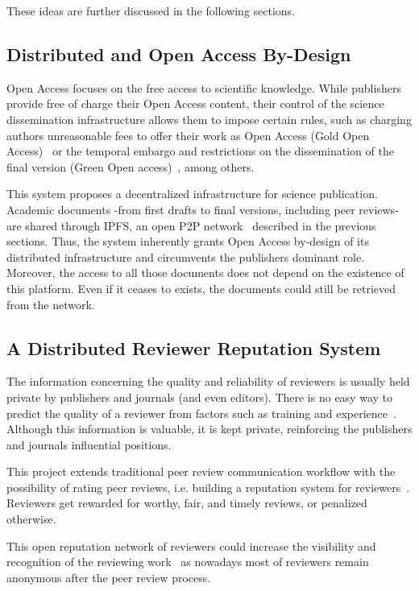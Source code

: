 These ideas are further discussed in the following sections.

\subsection{Distributed and Open Access By-Design}
\label{sec:open-access-design}

Open Access focuses on the free access to scientific knowledge. While publishers
provide free of charge their Open Access content, their control of the science
dissemination infrastructure allows them to impose certain rules, such as
charging authors unreasonable fees to offer their work as Open Access (Gold Open
Access)~\cite{solomon2012study} or the temporal embargo and restrictions on the
dissemination of the final version (Green Open access)~\cite{bjork2014anatomy},
among others.

This system proposes a decentralized infrastructure for science publication.
Academic documents -from first drafts to final versions, including peer reviews-
are shared through IPFS, an open P2P network~\cite{benet_ipfs-content_2014}
described in the previous sections. Thus, the system inherently grants Open
Access by-design of its distributed infrastructure and circumvents the
publishers dominant role. Moreover, the access to all those documents does not
depend on the existence of this platform. Even if it ceases to exists, the
documents could still be retrieved from the network.

\subsection{A Distributed Reviewer Reputation System}
\label{sec:distr-revi-reput}

The information concerning the quality and reliability of reviewers is usually
held private by publishers and journals (and even editors). There is no easy way
to predict the quality of a reviewer from factors such as training and
experience~\cite{callaham_relationship_2007}. Although this information is
valuable, it is kept private, reinforcing the publishers and journals
influential positions.

This project extends traditional peer review communication workflow with the
possibility of rating peer reviews, i.e. building a reputation system for
reviewers~\cite{resnick2000reputation}. Reviewers get rewarded for worthy, fair,
and timely reviews, or penalized otherwise.
    
This open reputation network of reviewers could increase the visibility and
recognition of the reviewing
work~\cite{rajpert-de_meyts_rewarding_2016,peere2018} as nowadays most of
reviewers remain anonymous after the peer review process.

